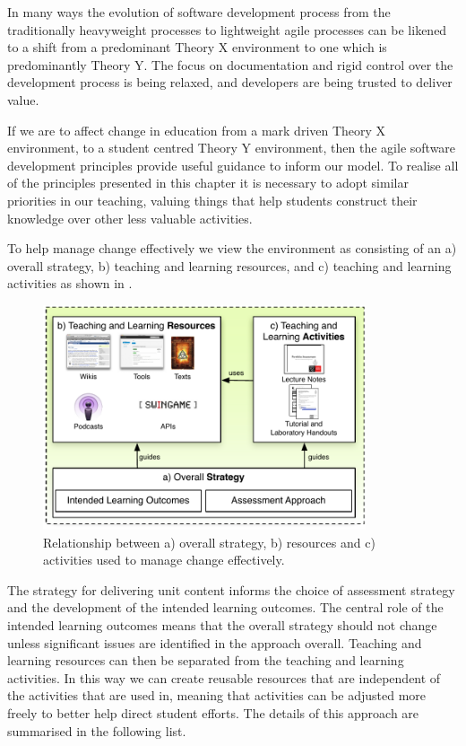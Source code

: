 In many ways the evolution of software development process from the traditionally heavyweight processes to lightweight agile processes can be likened to a shift from a predominant Theory X environment to one which is predominantly Theory Y. The focus on documentation and rigid control over the development process is being relaxed, and developers are being trusted to deliver value. 

If we are to affect change in education from a mark driven Theory X environment, to a student centred Theory Y environment, then the agile software development principles provide useful guidance to inform our model. To realise all of the principles presented in this chapter it is necessary to adopt similar priorities in our teaching, valuing things that help students construct their knowledge over other less valuable activities.

To help manage change effectively we view the environment as consisting of an a) overall strategy, b) teaching and learning resources, and c) teaching and learning activities as shown in . 

\begin{figure}[htbp]
	\centering
	\includegraphics[width=0.85\textwidth]{StrategyResourcesActivities}
	\caption{Relationship between a) overall strategy, b) resources and c) activities used to manage change effectively.}
	\label{fig:strategy}
\end{figure}

The strategy for delivering unit content informs the choice of assessment strategy and the development of the intended learning outcomes. The central role of the intended learning outcomes means that the overall strategy should not change unless significant issues are identified in the approach overall. Teaching and learning resources can then be separated from the teaching and learning activities. In this way we can create reusable resources that are independent of the activities that are used in, meaning that activities can be adjusted more freely to better help direct student efforts. The details of this approach are summarised in the following list.


